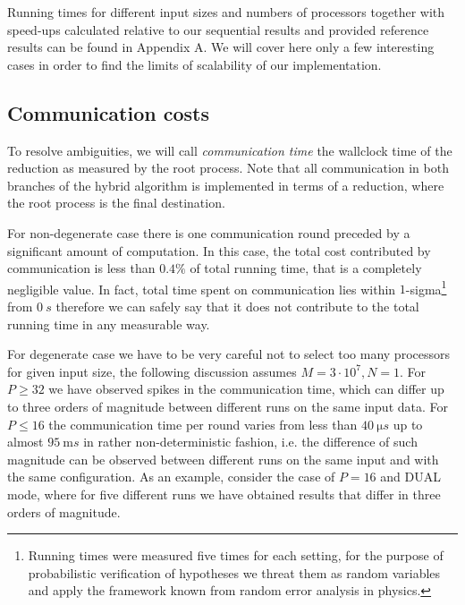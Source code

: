 Running times for different input sizes and numbers of processors together with speed-ups calculated relative to our sequential results and provided reference results can be found in Appendix A.
We will cover here only a few interesting cases in order to find the limits of scalability of our implementation.


\subsection*{Communication costs}

To resolve ambiguities, we will call \emph{communication time} the wallclock time of the reduction as measured by the root process.
Note that all communication in both branches of the hybrid algorithm is implemented in terms of a reduction, where the root process is the final destination.

For non-degenerate case there is one communication round preceded by a significant amount of computation.
In this case, the total cost contributed by communication is less than $0.4 \%$ of total running time, that is a completely negligible value.
In fact, total time spent on communication lies within $1$-sigma\footnote{Running times were measured five times for each setting, for the purpose of probabilistic verification of hypotheses we threat them as random variables and apply the framework known from random error analysis in physics.} from $\SI{0}{s}$ therefore we can safely say that it does not contribute to the total running time in any measurable way.

For degenerate case we have to be very careful not to select too many processors for given input size, the following discussion assumes $M = 3 \cdot 10^{7}, N = 1$.
For $P \geq 32$ we have observed spikes in the communication time, which can differ up to three orders of magnitude between different runs on the same input data.
For $P \leq 16$ the communication time per round varies from less than $\SI{40}{\micro s}$ up to almost $\SI{95}{\milli s}$ in rather non-deterministic fashion, i.e. the difference of such magnitude can be observed between different runs on the same input and with the same configuration.
As an example, consider the case of $P = 16$ and DUAL mode, where for five different runs we have obtained results that differ in three orders of magnitude.


